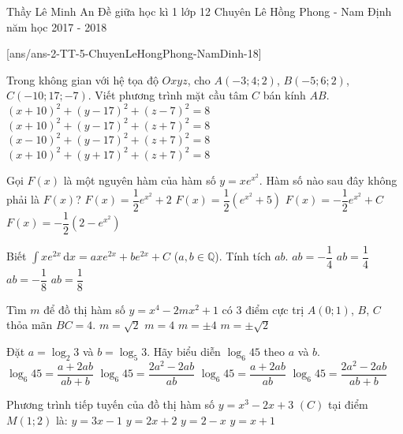 
\begin{name}
{Thầy Lê Minh An}
{Đề giữa học kì 1 lớp 12 Chuyên Lê Hồng Phong - Nam Định năm học 2017 - 2018}
\end{name}
\setcounter{ex}{0}
[ans/ans-2-TT-5-ChuyenLeHongPhong-NamDinh-18]
\begin{ex}%
Trong không gian với hệ tọa độ $Oxyz$, cho $A(-3;4;2)$, $B(-5;6;2)$, $C(-10;17;-7)$. Viết phương trình mặt cầu tâm $C$ bán kính $AB$.
\choice
{$(x+10)^2+(y-17)^2+(z-7)^2=8$}
{\True $(x+10)^2+(y-17)^2+(z+7)^2=8$}
{$(x-10)^2+(y-17)^2+(z+7)^2=8$}
{$(x+10)^2+(y+17)^2+(z+7)^2=8$}
\end{ex}

\begin{ex}%
Gọi $F(x)$ là một nguyên hàm của hàm số $y=xe^{x^2}$. Hàm số nào sau đây không phải là $F(x)$?
\choice
{$F(x)=\dfrac{1}{2}e^{x^2}+2$}
{$F(x)=\dfrac{1}{2}\left( e^{x^2}+5\right)$}
{\True $F(x)=-\dfrac{1}{2}e^{x^2}+C$}
{$F(x)=-\dfrac{1}{2}\left(2- e^{x^2}\right)$}
\end{ex}

\begin{ex}%
Biết $\displaystyle\int xe^{2x}\mathrm{\, d}x=axe^{2x}+be^{2x}+C$ ($a,b\in\mathbb{Q}$). Tính tích $ab$.
\choice
{$ab=-\dfrac{1}{4}$}
{$ab=\dfrac{1}{4}$}
{\True $ab=-\dfrac{1}{8}$}
{$ab=\dfrac{1}{8}$}
\end{ex}

\begin{ex}%
Tìm $m$ để đồ thị hàm số $y=x^4-2mx^2+1$ có 3 điểm cực trị $A(0;1)$, $B$, $C$ thỏa mãn $BC=4$.
\choice
{$m=\sqrt{2}$}
{\True $m=4$}
{$m=\pm 4$}
{$m=\pm \sqrt{2}$}
\end{ex}

\begin{ex}%
Đặt $a=\log_2 3$ và $b=\log_5 3$. Hãy biểu diễn $\log_6 45$ theo $a$ và $b$.
\choice
{\True $\log_6 45=\dfrac{a+2ab}{ab+b}$}
{$\log_6 45=\dfrac{2a^2-2ab}{ab}$}
{$\log_6 45=\dfrac{a+2ab}{ab}$}
{$\log_6 45=\dfrac{2a^2-2ab}{ab+b}$}
\end{ex}

\begin{ex}%
Phương trình tiếp tuyến của đồ thị hàm số $y=x^3-2x+3$ $(C)$ tại điểm $M(1;2)$ là:
\choice
{$y=3x-1$}
{$y=2x+2$}
{$y=2-x$}
{\True $y=x+1$}
\end{ex}

